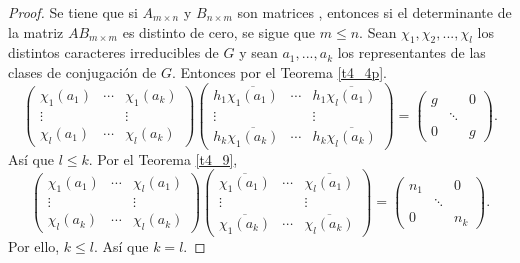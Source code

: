 \documentclass[12pt]{book}
\theoremstyle{definition}
\newcounter{in}
\begin{document}
\begin{proof}
  Se tiene que si $A_{m\times n}$ y $B_{n\times m}$ son matrices ,
  entonces si el determinante de la matriz $AB_{m\times m}$ es
  distinto de cero, se sigue que $m \leq n$.  Sean
  $\chi_{1}, \chi_{2},...,\chi_{l}$ los distintos caracteres
  irreducibles de $G$ y sean $a_{1},...,a_{k}$ los representantes de
  las clases de conjugación de $G$. Entonces por el Teorema
  \ref{t4_4p}.
  \begin{equation}
    \label{eq:56}
    \begin{pmatrix}
    \chi_{1}(a_{1}) & \cdots & \chi_{1}(a_{k}) \\ 
    \vdots &  & \vdots \\
    \chi_{l}(a_{1}) & \cdots & \chi_{l}(a_{k})
  \end{pmatrix}
  \begin{pmatrix}
    h_{1} \overline{\chi_{1}(a_{1})} & \cdots & h_{1} \overline{\chi_{l}(a_{1})} \\ 
    \vdots &  & \vdots \\
    h_{k} \overline{\chi_{1}(a_{k})} & \cdots & h_{k} \overline{\chi_{l}(a_{k})}  
  \end{pmatrix}
  =
  \begin{pmatrix}
   g & & 0\\ 
     & \ddots & \\
     0 &  & g
   \end{pmatrix}
   .
  \end{equation}
  Así que $l \leq k$. Por el Teorema \ref{t4_9},
  \begin{equation}
    \label{eq:57}
    \begin{pmatrix}
    \chi_{1}(a_{1}) & \cdots & \chi_{l}(a_{1}) \\ 
    \vdots &  & \vdots \\
    \chi_{l}(a_{k}) & \cdots & \chi_{l}(a_{k})
  \end{pmatrix}
  \begin{pmatrix}
     \overline{\chi_{1}(a_{1})} & \cdots &  \overline{\chi_{l}(a_{1})} \\ 
    \vdots &  & \vdots \\
     \overline{\chi_{1}(a_{k})} & \cdots &  \overline{\chi_{l}(a_{k})}  
   \end{pmatrix}
   =
  \begin{pmatrix}
   n_{1} & & 0\\ 
     & \ddots & \\

     0 &  & n_{k}
   \end{pmatrix}
   .
  \end{equation}
Por ello, $k \leq l$. Así que $k=l$.
\end{proof}
\end{document}
